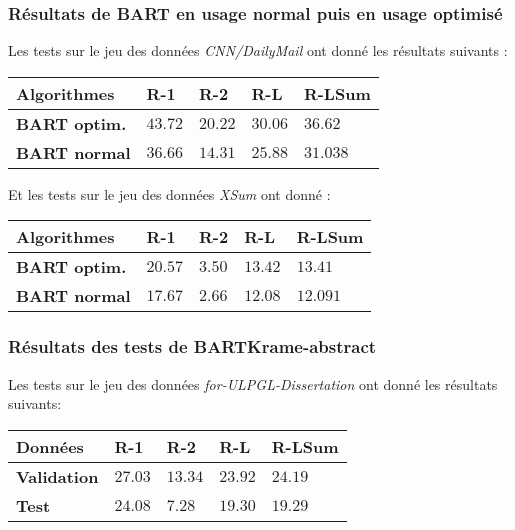 \subsubsection{Résultats de BART en usage normal puis en usage optimisé}
Les tests sur le jeu des données \textit{CNN/DailyMail} ont donné les résultats suivants :
\begin{center}
\label{BARTvsBARToptCNN}
\setlength{\arrayrulewidth}{1pt}
\begin{tabular}{|p{5cm}||p{2.5cm}|p{2.5cm}|p{2.5cm}|p{2.5cm}|}
\hline
\cellcolor{gris}\textbf{Algorithmes} & R-1  & R-2 & R-L & R-LSum \\
\hline
\hline
\textbf{BART optim.} & $ 43.72 $  & $ 20.22 $  & $ 30.06 $ & $ 36.62 $ \\
\hline
\textbf{BART normal} & $ 36.66 $ & $ 14.31 $  & $ 25.88 $ & $ 31.038 $ \\
\hline
\end{tabular}
\end{center}
Et les tests sur le jeu des données \textit{XSum} ont donné :
\begin{center}
\label{BARTvsBARToptXSum}
\setlength{\arrayrulewidth}{1pt}
\begin{tabular}{|p{5cm}||p{2.5cm}|p{2.5cm}|p{2.5cm}|p{2.5cm}|}
\hline
\cellcolor{gris}\textbf{Algorithmes} & R-1  & R-2 & R-L & R-LSum \\
\hline
\hline
\textbf{BART optim.} & $ 20.57 $  & $ 3.50 $  & $ 13.42 $ & $ 13.41 $ \\
\hline
\textbf{BART normal} & $ 17.67 $ & $ 2.66 $  & $ 12.08 $ & $ 12.091 $ \\
\hline
\end{tabular}
\end{center}

\subsubsection{Résultats des tests de BARTKrame-abstract}
Les tests sur le jeu des données \textit{for-ULPGL-Dissertation} ont donné les résultats suivants:
\begin{center}
\label{ResultBARTkrame-abstract}
\setlength{\arrayrulewidth}{1pt}
\begin{tabular}{|p{5cm}||p{2.5cm}|p{2.5cm}|p{2.5cm}|p{2.5cm}|}
\hline
\cellcolor{gris}\textbf{Données} & R-1  & R-2 & R-L & R-LSum \\
\hline
\hline
\textbf{Validation} & $ 27.03 $  & $ 13.34 $  & $ 23.92 $ & $ 24.19 $ \\
\hline
\textbf{Test} & $ 24.08 $ & $ 7.28 $  & $ 19.30 $ & $ 19.29 $ \\
\hline
\end{tabular}
\end{center}

